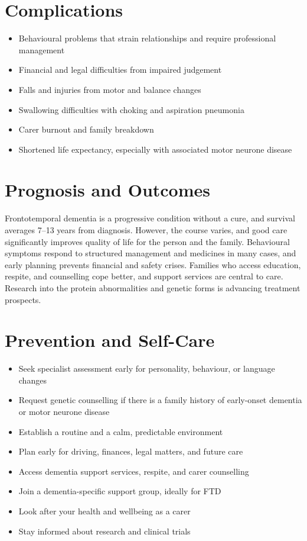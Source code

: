 \section*{Complications}
\begin{itemize}
    \item Behavioural problems that strain relationships and require professional management
    \item Financial and legal difficulties from impaired judgement
    \item Falls and injuries from motor and balance changes
    \item Swallowing difficulties with choking and aspiration pneumonia
    \item Carer burnout and family breakdown
    \item Shortened life expectancy, especially with associated motor neurone disease
\end{itemize}

\section*{Prognosis and Outcomes}
Frontotemporal dementia is a progressive condition without a cure, and survival averages 7--13 years from diagnosis. However, the course varies, and good care significantly improves quality of life for the person and the family. Behavioural symptoms respond to structured management and medicines in many cases, and early planning prevents financial and safety crises. Families who access education, respite, and counselling cope better, and support services are central to care. Research into the protein abnormalities and genetic forms is advancing treatment prospects.

\section*{Prevention and Self-Care}
\begin{itemize}
    \item Seek specialist assessment early for personality, behaviour, or language changes
    \item Request genetic counselling if there is a family history of early-onset dementia or motor neurone disease
    \item Establish a routine and a calm, predictable environment
    \item Plan early for driving, finances, legal matters, and future care
    \item Access dementia support services, respite, and carer counselling
    \item Join a dementia-specific support group, ideally for FTD
    \item Look after your health and wellbeing as a carer
    \item Stay informed about research and clinical trials
\end{itemize}

